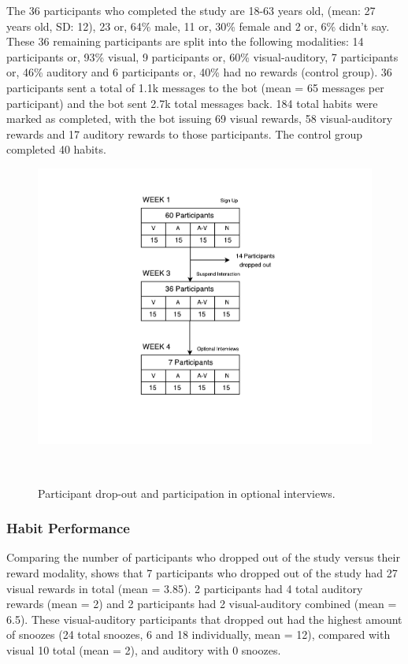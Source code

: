 The 36 participants who completed the study are 18-63 years old, (mean: 27 years old, SD: 12), 23 or, 64\% male, 11 or, 30\% female and 2 or, 6\% didn't say. These 36 remaining participants are split into the following modalities: 14 participants or, 93\% visual, 9 participants or, 60\% visual-auditory, 7 participants or, 46\% auditory and 6 participants or, 40\% had no rewards (control group). 36 participants sent a total of 1.1k messages to the bot (mean = 65 messages per participant) and the bot sent 2.7k total messages back. 184 total habits were marked as completed, with the bot issuing 69 visual rewards, 58 visual-auditory rewards and 17 auditory rewards to those participants. The control group completed 40 habits.

\begin{figure}[H]
  \centering
  \includegraphics[width=.9\columnwidth]{resources/figures/study-flow.pdf}
  \caption{Participant drop-out and participation in optional interviews.}~\label{fig:study_dropout}
\end{figure}

\subsubsection*{Habit Performance}
Comparing the number of participants who dropped out of the study versus their reward modality, shows that 7 participants who dropped out of the study had 27 visual rewards in total (mean = 3.85). 2 participants had 4 total auditory rewards (mean = 2) and 2 participants had 2 visual-auditory combined (mean = 6.5). These visual-auditory participants that dropped out had the highest amount of snoozes (24 total snoozes, 6 and 18 individually, mean = 12), compared with visual 10 total (mean = 2), and auditory with 0 snoozes.

